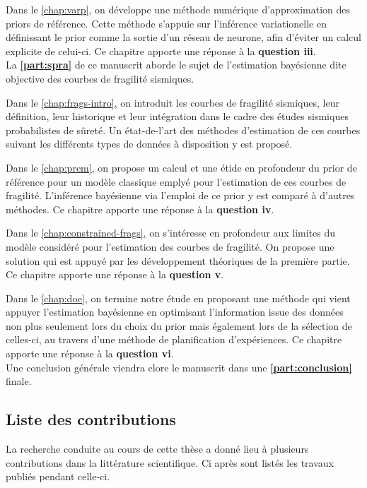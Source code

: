 \noindent
Dans le \cref{chap:varp}, on développe une méthode numérique d'approximation des priors de référence. Cette méthode s'appuie sur l'inférence variationelle en définissant le prior comme la sortie d'un réseau de neurone, afin d'éviter un calcul explicite de celui-ci. Ce chapitre apporte une réponse à la \textbf{question iii}. \\


La \textbf{\cref{part:spra}} de ce manuscrit aborde le sujet de l'estimation bayésienne dite objective des courbes de fragilité sismiques.

\noindent
Dans le \cref{chap:frags-intro}, on introduit les courbes de fragilité sismiques, leur définition, leur historique et leur intégration dans le cadre des études sismiques probabilistes de sûreté. Un état-de-l'art des méthodes d'estimation de ces courbes suivant les différents types de données à disposition y est proposé.

\noindent
Dans le \cref{chap:prem}, on propose un calcul et une étide en profondeur du prior de référence pour un modèle classique emplyé pour l'estimation de ces courbes de fragilité. L'inférence bayésienne via l'emploi de ce prior y est comparé à d'autres méthodes. Ce chapitre apporte une réponse à la \textbf{question iv}.

\noindent
Dans le \cref{chap:constrained-frags}, on s'intéresse en profondeur aux limites du modèle considéré pour l'estimation des courbes de fragilité. On propose une solution qui est appuyé par les développement théoriques de la première partie. Ce chapitre apporte une réponse à la \textbf{question v}.

\noindent
Dans le \cref{chap:doe}, on termine notre étude en proposant une méthode qui vient appuyer l'estimation bayésienne en optimisant l'information issue des données non plus seulement  lors du choix du prior mais également lors de la sélection de celles-ci, au travers d'une méthode de planification d'expériences. Ce chapitre apporte une réponse à la \textbf{question vi}.\\


Une conclusion générale viendra clore le manuscrit dans une \textbf{\cref{part:conclusion}} finale.


\subsection{Liste des contributions}

La recherche conduite au cours de cette thèse a donné lieu à plusieurs contributions dans la littérature scientifique. Ci après sont listés les travaux publiés pendant celle-ci.

